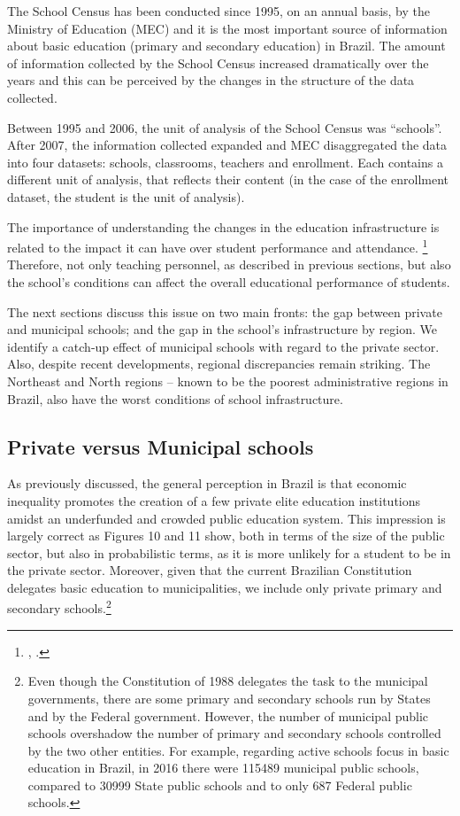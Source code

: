 \documentclass[12pt,]{book}
\let\rmarkdownfootnote\footnote%
\def\footnote{\protect\rmarkdownfootnote}
\begin{document}
The School Census has been conducted since 1995, on an annual basis, by the Ministry of Education (MEC) and it is the most important source of information about basic education (primary and secondary education) in Brazil. The amount of information collected by the School Census increased dramatically over the years and this can be perceived by the changes in the structure of the data collected.

Between 1995 and 2006, the unit of analysis of the School Census was ``schools''. After 2007, the information collected expanded and MEC disaggregated the data into four datasets: schools, classrooms, teachers and enrollment. Each contains a different unit of analysis, that reflects their content (in the case of the enrollment dataset, the student is the unit of analysis).

The importance of understanding the changes in the education infrastructure is related to the impact it can have over student performance and attendance. \footnote{\citet{branham_wise_2004}, \citet{murillo_school_2011}.} Therefore, not only teaching personnel, as described in previous sections, but also the school's conditions can affect the overall educational performance of students.

The next sections discuss this issue on two main fronts: the gap between private and municipal schools; and the gap in the school's infrastructure by region. We identify a catch-up effect of municipal schools with regard to the private sector. Also, despite recent developments, regional discrepancies remain striking. The Northeast and North regions -- known to be the poorest administrative regions in Brazil, also have the worst conditions of school infrastructure.

\subsection{Private versus Municipal schools}

As previously discussed, the general perception in Brazil is that economic inequality promotes the creation of a few private elite education institutions amidst an underfunded and crowded public education system. This impression is largely correct as Figures 10 and 11 show, both in terms of the size of the public sector, but also in probabilistic terms, as it is more unlikely for a student to be in the private sector. Moreover, given that the current Brazilian Constitution delegates basic education to municipalities, we include only private primary and secondary schools.\footnote{Even though the Constitution of 1988 delegates the task to the municipal governments, there are some primary and secondary schools run by States and by the Federal government. However, the number of municipal public schools overshadow the number of primary and secondary schools controlled by the two other entities. For example, regarding active schools focus in basic education in Brazil, in 2016 there were 115489 municipal public schools, compared to 30999 State public schools and to only 687 Federal public schools.}
\end{document}
